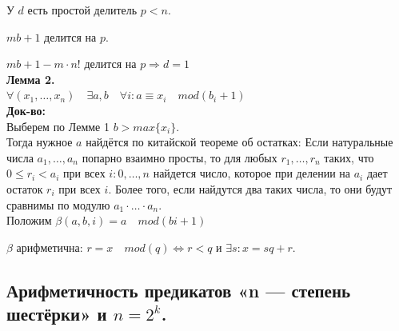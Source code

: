 У $d$ есть простой делитель $p < n$.

$mb + 1$ делится на $p$.

$mb + 1 - m\cdot n!$ делится на $p \Rightarrow d = 1$ 
\\

\textbf{Лемма 2.}\\

$\forall (x_1, \dotsc, x_n) \quad\exists a, b \quad \forall i : a \equiv x_i \quad mod (b_i + 1)$\\

\textbf{Док-во:}\\

Выберем по Лемме 1 $b > max\{x_i\}$.\\

Тогда нужное $a$ найдётся по китайской теореме об остатках: Если натуральные числа $a_1, \dotsc, a_n$  попарно взаимно просты, то для любых $r_1, \dotsc, r_n$ таких, что $0 \leq r_i < a_i$ при всех $i : 0, \dotsc, n$ найдется число, которое при делении на $a_i$ дает остаток $r_i$ при всех $i$. Более того, если найдутся два таких числа, то они будут сравнимы по модулю $a_1 \cdot \dotsc \cdot a_n$.\\

Положим $\beta(a, b, i) = a \quad mod (bi + 1)$

$\beta$ арифметична: $r = x \quad mod(q) \Leftrightarrow r < q$ и $\exists s: x = sq + r$.

\subsection{Арифметичность предикатов «n — степень шестёрки» и $n = 2^k$.}

